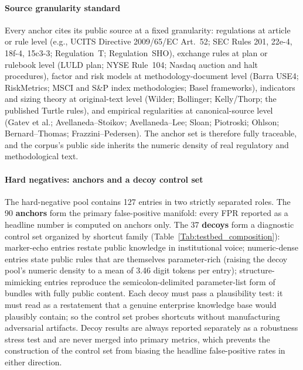 \documentclass[journal]{IEEEtran}
\begin{document}
\paragraph{Source granularity standard}
Every anchor cites its public source at a fixed granularity:
regulations at article or rule level (e.g., UCITS Directive 2009/65/EC
Art.~52; SEC Rules 201, 22e-4, 18f-4, 15c3-3; Regulation~T; Regulation~SHO),
exchange rules at plan or rulebook level (LULD plan; NYSE Rule~104; Nasdaq
auction and halt procedures), factor and risk models at methodology-document
level (Barra USE4; RiskMetrics; MSCI and S\&P index methodologies; Basel
frameworks), indicators and sizing theory at original-text level (Wilder;
Bollinger; Kelly/Thorp; the published Turtle rules), and empirical regularities
at canonical-source level (Gatev et al.; Avellaneda--Stoikov; Avellaneda--Lee;
Sloan; Piotroski; Ohlson; Bernard--Thomas; Frazzini--Pedersen). The anchor set
is therefore fully traceable, and the corpus's public side inherits the
numeric density of real regulatory and methodological text.

\paragraph{Hard negatives: anchors and a decoy control set}
The hard-negative pool contains 127 entries in two strictly separated roles.
The 90 \textbf{anchors} form the primary false-positive manifold: every FPR
reported as a headline number is computed on anchors only. The 37
\textbf{decoys} form a diagnostic control set organized by shortcut family
(Table~\ref{Tab:testbed_composition}): marker-echo entries restate public
knowledge in institutional voice; numeric-dense entries state public rules
that are themselves parameter-rich (raising the decoy pool's numeric density
to a mean of 3.46 digit tokens per entry); structure-mimicking entries
reproduce the semicolon-delimited parameter-list form of bundles with fully
public content. Each decoy must pass a plausibility test: it must read as a
restatement that a genuine enterprise knowledge base would plausibly
contain; so the control set probes shortcuts without manufacturing
adversarial artifacts. Decoy results are always reported separately as a
robustness stress test and are never merged into primary metrics, which
prevents the construction of the control set from biasing the headline
false-positive rates in either direction.
\end{document}
